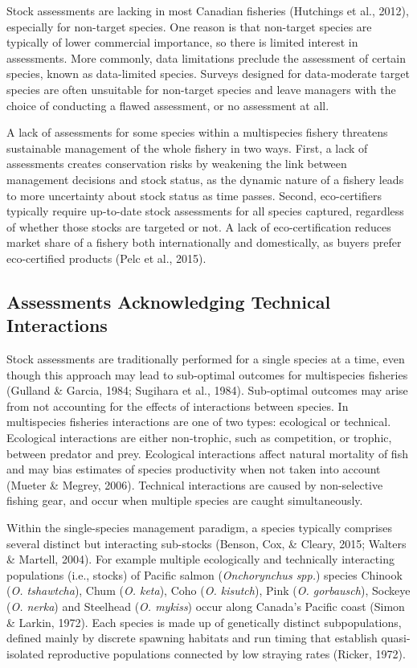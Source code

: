 \documentclass[12pt,]{scrartcl}
\begin{document}
Stock assessments are lacking in most Canadian fisheries (Hutchings et
al., 2012), especially for non-target species. One reason is that
non-target species are typically of lower commercial importance, so
there is limited interest in assessments. More commonly, data
limitations preclude the assessment of certain species, known as
data-limited species. Surveys designed for data-moderate target species
are often unsuitable for non-target species and leave managers with the
choice of conducting a flawed assessment, or no assessment at all.

A lack of assessments for some species within a multispecies fishery
threatens sustainable management of the whole fishery in two ways.
First, a lack of assessments creates conservation risks by weakening the
link between management decisions and stock status, as the dynamic
nature of a fishery leads to more uncertainty about stock status as time
passes. Second, eco-certifiers typically require up-to-date stock
assessments for all species captured, regardless of whether those stocks
are targeted or not. A lack of eco-certification reduces market share of
a fishery both internationally and domestically, as buyers prefer
eco-certified products (Pelc et al., 2015).

\subsection{Assessments Acknowledging Technical
Interactions}\label{assessments-acknowledging-technical-interactions}

Stock assessments are traditionally performed for a single species at a
time, even though this approach may lead to sub-optimal outcomes for
multispecies fisheries (Gulland \& Garcia, 1984; Sugihara et al., 1984).
Sub-optimal outcomes may arise from not accounting for the effects of
interactions between species. In multispecies fisheries interactions are
one of two types: ecological or technical. Ecological interactions are
either non-trophic, such as competition, or trophic, between predator
and prey. Ecological interactions affect natural mortality of fish and
may bias estimates of species productivity when not taken into account
(Mueter \& Megrey, 2006). Technical interactions are caused by
non-selective fishing gear, and occur when multiple species are caught
simultaneously.

Within the single-species management paradigm, a species typically
comprises several distinct but interacting sub-stocks (Benson, Cox, \&
Cleary, 2015; Walters \& Martell, 2004). For example multiple
ecologically and technically interacting populations (i.e., stocks) of
Pacific salmon (\emph{Onchorynchus spp.}) species Chinook (\emph{O.
tshawtcha}), Chum (\emph{O. keta}), Coho (\emph{O. kisutch}), Pink
(\emph{O. gorbausch}), Sockeye (\emph{O. nerka}) and Steelhead (\emph{O.
mykiss}) occur along Canada's Pacific coast (Simon \& Larkin, 1972).
Each species is made up of genetically distinct subpopulations, defined
mainly by discrete spawning habitats and run timing that establish
quasi-isolated reproductive populations connected by low straying rates
(Ricker, 1972).
\end{document}
